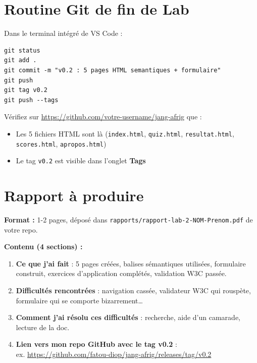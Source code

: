 \documentclass[11pt,a4paper]{article}
\begin{document}
\newpage

\section{Routine Git de fin de Lab}

Dans le terminal intégré de VS Code :

\begin{lstlisting}
git status
git add .
git commit -m "v0.2 : 5 pages HTML semantiques + formulaire"
git push
git tag v0.2
git push --tags
\end{lstlisting}

Vérifiez sur \url{https://github.com/votre-username/jang-afrig} que :
\begin{itemize}[nosep]
    \item Les 5 fichiers HTML sont là (\texttt{index.html}, \texttt{quiz.html}, \texttt{resultat.html}, \texttt{scores.html}, \texttt{apropos.html})
    \item Le tag \texttt{v0.2} est visible dans l'onglet \textbf{Tags}
\end{itemize}

\section{Rapport à produire}

\begin{attentionbox}
\textbf{Format :} 1-2 pages, déposé dans \texttt{rapports/rapport-lab-2-NOM-Prenom.pdf}
de votre repo.

\medskip

\textbf{Contenu (4 sections) :}
\begin{enumerate}[nosep]
    \item \textbf{Ce que j'ai fait} : 5 pages créées, balises sémantiques utilisées, formulaire construit, exercices d'application complétés, validation W3C passée.
    \item \textbf{Difficultés rencontrées} : navigation cassée, validateur W3C qui rouspète, formulaire qui se comporte bizarrement\ldots
    \item \textbf{Comment j'ai résolu ces difficultés} : recherche, aide d'un camarade, lecture de la doc.
    \item \textbf{Lien vers mon repo GitHub avec le tag v0.2} : \\
          ex. \url{https://github.com/fatou-diop/jang-afrig/releases/tag/v0.2}
\end{enumerate}
\end{attentionbox}
\end{document}
